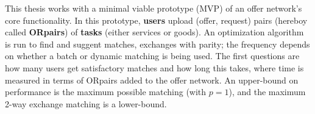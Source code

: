 \documentclass[main.tex]{subfiles}
\begin{document}
This thesis works with a minimal viable prototype (MVP) of an offer network's core functionality. In this prototype, \textbf{users} upload (offer, request) pairs (hereboy called \textbf{ORpairs}) of \textbf{tasks} (either services or goods). An optimization algorithm is run to find and suggent matches, exchanges with parity; the frequency depends on whether a batch or dynamic matching is being used. The first questions are how many users get satisfactory matches and how long this takes, where time is measured in terms of ORpairs added to the offer network. An upper-bound on performance is the maximum possible matching (with $p=1$), and the maximum 2-way exchange matching is a lower-bound.
\end{document}
